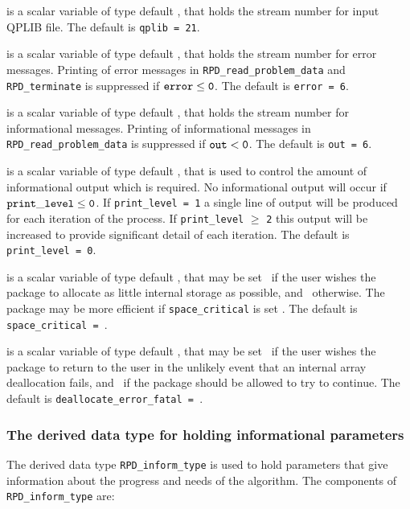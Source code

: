 \documentclass{galahad}
\newcommand{\packagename}{RPD}
\begin{document}
\begin{description}
 is a scalar variable of type default \integer, that holds the
stream number for input QPLIB file.
The default is {\tt qplib = 21}.

 is a scalar variable of type default \integer, that holds the
stream number for error messages.
Printing of error messages in
{\tt \packagename\_read\_problem\_data} and {\tt \packagename\_terminate}
is suppressed if ${\tt error} \leq {\tt 0}$.
The default is {\tt error = 6}.

 is a scalar variable of type default \integer, that holds the
stream number for informational messages.
Printing of informational messages in
{\tt \packagename\_read\_problem\_data} is suppressed if ${\tt out} < {\tt 0}$.
The default is {\tt out = 6}.

 is a scalar variable of type default \integer,
that is used
to control the amount of informational output which is required. No
informational output will occur if ${\tt print\_level} \leq {\tt 0}$. If
{\tt print\_level = 1} a single line of output will be produced for each
iteration of the process. If {\tt print\_level} $\geq$ {\tt 2} this output
will be increased to provide significant detail of each iteration.
The default is {\tt print\_level = 0}.

 is a scalar variable of type default \logical, that
may be set \true\ if the user wishes the package to allocate as little
internal storage as possible, and \false\ otherwise. The package may
be more efficient if {\tt space\_critical} is set \false.
The default is {\tt space\_critical = \false}.

 is a scalar variable of type default \logical,
that may be set \true\ if the user wishes the package to return to the user
in the unlikely event that an internal array deallocation fails,
and \false\ if the package should be allowed to try to continue.
The default is {\tt deallocate\_error\_fatal = \false}.

\end{description}


\subsubsection{The derived data type for holding informational
 parameters}\label{typeinform}
The derived data type
{\tt \packagename\_inform\_type}
is used to hold parameters that give information about the progress and needs
of the algorithm. The components of
{\tt \packagename\_inform\_type}
are:
\end{document}
